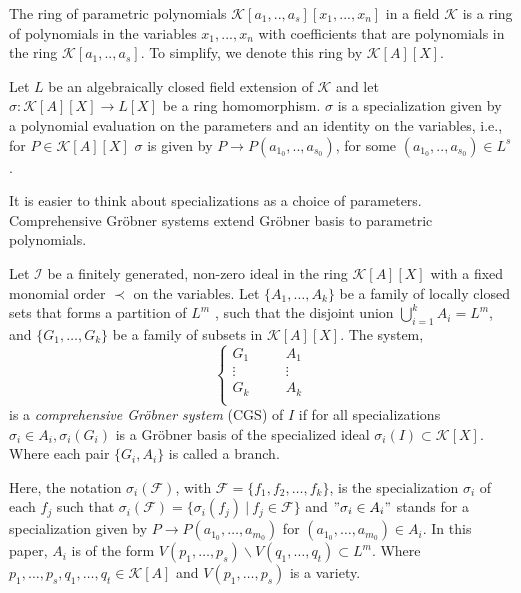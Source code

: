 \documentclass[runningheads]{llncs}
\newcommand{\1}{\chi}
\newcommand{\Ff}{\mathcal{F}}
\newcommand{\Ii}{\mathcal{I}}
\begin{document}
\begin{definition}
The ring of parametric polynomials
    $\mathcal{K}[a_1,..,a_s][x_1,...,x_n]$ in a field $\mathcal{K}$ is a ring of polynomials in the variables $x_1,...,x_n$ with coefficients that are polynomials
    in the ring $\mathcal{K}[a_1,..,a_s]$. 
    To simplify, we denote this ring by $\mathcal{K}[A][X]$.
\end{definition}

\begin{definition}
    Let $L$ be an algebraically closed field extension of $\mathcal{K}$ and let $\sigma:\mathcal{K}[A][X]\rightarrow L[X]$ be a ring homomorphism. $\sigma$ is a specialization given by a polynomial evaluation on the parameters and an identity on the variables, i.e., 
    for $P\in \mathcal{K}[A][X]$
    $\sigma$ is given by $P\rightarrow P(a_{1_0},..,a_{s_0})$, for some $(a_{1_0},..,a_{s_0})\in L^s$.
    
\end{definition}
It is easier to think about specializations as a choice of parameters. 
Comprehensive Gr{\"o}bner systems extend Gr{\"o}bner basis to 
parametric polynomials.
\begin{definition}
    Let $\Ii$ be a finitely generated, non-zero ideal in the ring $\mathcal{K}[A][X]$ with a fixed monomial order $\prec$ on the variables. 
    Let $\{A_1,\dots,A_k\}$ be a family of locally closed sets that forms a partition of $L^m$ 
    , such that the disjoint union $\bigcup\limits_{i=1}^k A_i=L^m$, and $\{G_1,\dots,G_k\}$ 
    be a family of subsets in $\mathcal{K}[A][X]$.
    The system, 
	\begin{equation}\label{CGS}
	\left\{
		\begin{array}{lll}
			G_1 &\quad& A_1 \\
			\vdots  &\quad& \vdots \\ 
			G_k &\quad & A_k \\
		\end{array}
		\right. 
	\end{equation}
    is a {\it comprehensive Gr{\"o}bner system} (CGS) of $I$
     if for all specializations $\sigma_i \in A_i, \sigma_i (G_i)$ 
     is a Gr{\"o}bner basis of the specialized ideal $\sigma_i (I)\subset \mathcal{K}[X]$.
     Where each pair $\{G_i,A_i\}$ is called a branch. \cite{Kapur}
\end{definition}
Here, the notation $\sigma_i (\Ff)$, with $\Ff=\{f_1,f_2,\dots ,f_k\}$, is the specialization $\sigma_i$
of each $f_j$ such that  $\sigma_i (\Ff)=\{\sigma_i(f_j)~|~ f_j\in \Ff\}$
and  $"\sigma_i \in A_i"$ stands for a specialization given by $P\rightarrow P(a_{1_0},\dots,a_{m_0})$ 
for $(a_{1_0},\dots,a_{m_0})\in A_i$.
In this paper, $A_i$ is of the form 
$V(p_1,\dots,p_s)\backslash V(q_1,\dots,q_t) \subset L^m$.
Where $p_1,\dots,p_s,q_1,\dots,q_t\in \mathcal{K}[A]$ and $V(p_1,\dots,p_s)$ is a variety.
\end{document}
